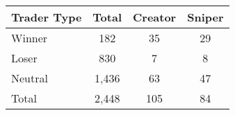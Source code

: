 \begin{tabular}{lccc}
\toprule
Trader Type & Total & Creator & Sniper \\
\midrule
Winner & 182 &  35 & 29 \\
Loser & 830 &  7 & 8 \\
Neutral & 1,436 &  63 & 47 \\
\midrule
Total & 2,448 &  105 & 84 \\
\bottomrule
\end{tabular}